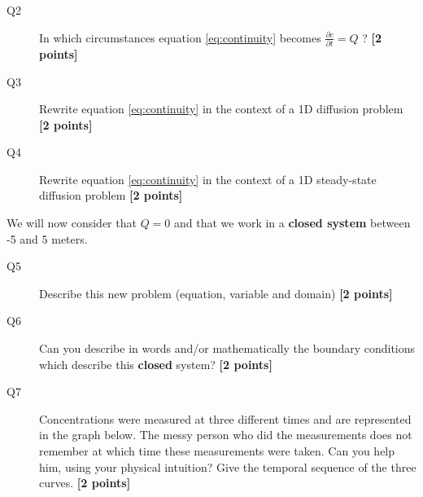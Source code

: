 \documentclass{article}
\begin{document}
\begin{description}
\item [Q2] In which circumstances equation \ref{eq:continuity} becomes $ \frac{\partial c}{\partial t}  = Q$ ? \textbf{[2 points]}
\vspace{2cm}

\item [Q3] Rewrite equation \ref{eq:continuity} in the context of a 1D diffusion problem \textbf{[2 points]}
\vspace{2cm}
\item [Q4] Rewrite equation \ref{eq:continuity} in the context of a 1D steady-state diffusion problem \textbf{[2 points]}
\vspace{2cm}
\end{description}

We will now consider that $Q=0$ and that we work in a \textbf{closed system} between -5 and 5 meters. 


\begin{description}
\item [Q5] Describe this new problem (equation, variable and domain) \textbf{[2 points]}
\vspace{2cm}
\item [Q6] Can you describe in words and/or mathematically the boundary conditions which describe this \textbf{closed} system? \textbf{[2 points]}
\vspace{2cm}

\item [Q7] Concentrations were measured at three different times and are represented in the graph below. The messy person who did the measurements does not remember at which time these measurements were taken. Can you help him, using your physical intuition? Give the temporal sequence of the three curves.  \textbf{[2 points]}

\end{description}

\end{document}
